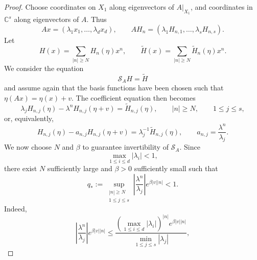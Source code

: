 \documentclass{amsart}
\theoremstyle{plain}
\theoremstyle{definition}
\begin{document}
\begin{proof}
Choose coordinates on $X_1$ along eigenvectors of $A|_{X_1}$, and coordinates in
$\mathbb C^s$ along eigenvectors of $A$. Thus
\begin{equation}
        Ax=(\lambda_1x_1,\ldots,\lambda_dx_d),
        \qquad
        AH_n=(\lambda_1H_{n,1},\ldots,\lambda_sH_{n,s}).
\end{equation}
Let
\begin{equation}
        H(x)=\sum_{|n|\geq N}H_n(\eta)x^n,
        \qquad
        \widetilde H(x)=\sum_{|n|\geq N}\widetilde H_n(\eta)x^n.
\end{equation}
We consider the equation
\begin{equation}
        \mathcal S_AH=\widetilde H
\end{equation}
and assume again that the basis functions have been chosen such that $\eta(Ax)=\eta(x)+v$. The coefficient equation then becomes
\begin{equation}\label{coeff_SA}
        \lambda_j H_{n,j}(\eta)
        -
        \lambda^n H_{n,j}(\eta+v)
        =
        \widetilde H_{n,j}(\eta),
        \qquad
        |n|\geq N,
        \qquad
        1\leq j\leq s,
\end{equation}
or, equivalently,
\begin{equation}\label{coeff_shift}
        H_{n,j}(\eta)
        -
        a_{n,j}H_{n,j}(\eta+v)
        =
        \lambda_j^{-1}\widetilde H_{n,j}(\eta),
        \qquad
        a_{n,j}=\frac{\lambda^n}{\lambda_j}.
\end{equation}
We now choose $N$ and $\beta$ to guarantee invertibility of $\mathcal{S}_A$. Since
\begin{equation}
        \max_{1\leq i\leq d}|\lambda_i|<1,
\end{equation}
there exist $N$ sufficiently large and $\beta>0$ sufficiently small such that
\begin{equation}\label{qstar_condition}
        q_*
        :=
        \sup_{\substack{|n|\geq N\\1\leq j\leq s}}
        \left|
        \frac{\lambda^n}{\lambda_j}
        \right|
        e^{\beta |v||n|}
        <1.
\end{equation}
Indeed,
\begin{equation}
        \left|
        \frac{\lambda^n}{\lambda_j}
        \right|
        e^{\beta |v||n|}
        \le
        \frac{
        \left(\max_{1\leq i\leq d}|\lambda_i|\right)^{|n|}
        e^{\beta |v||n|}
        }{
        \min_{1\leq j\leq s}|\lambda_j|
        },

\end{equation}
\end{proof}
\end{document}
